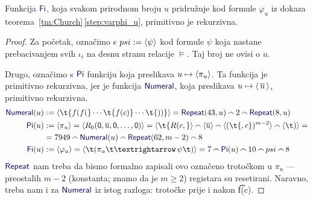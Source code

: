 \begin{lema}[{name=[primitivna rekurzivnost svođenja $K$ na $Valid$]}]
Funkcija $\f{Fi}$, koja svakom prirodnom broju $u$ pridružuje kod formule $\varphi_u$ iz dokaza teorema~\ref{tm:Church}\,\eqref{step:varphi_u}, primitivno je rekurzivna.
\end{lema}
\begin{proof}
Za početak, označimo s $psi:=\langle\psi\rangle$ kod formule $\psi$ koja nastane prebacivanjem svih $\iota_i$ na desnu stranu relacije $\models$. Taj broj ne ovisi o $u$.

Drugo, označimo s $\f{Pi}$ funkciju koja preslikava $u\mapsto\langle\pi_u\rangle$. Ta funkcija je primitivno rekurzivna, jer je funkcija $\f{Numeral}$, koja preslikava $u\mapsto\langle\,\overline u\,\rangle$, primitivno rekurzivna.
\begin{align}
    \f{Numeral}(u)&:=\kr{\t{f(f(}\dotsm\t{f(c)}\dotsm\t{))}}=\f{Repeat}(43,u)\conc{}2\conc{}\f{Repeat}(8,u)\\
    \f{Pi}(u)&:=\kr{\pi_u}=\kr{R_0(\mathsf0,\overline u,\mathsf0,\dotsc,\mathsf0)}=
    \kr{\t{R(c,}}\conc{}\kr{\overline u}\conc{}\kr{(\t{,c})^{m-2}}\conc{}\kr{\t)}=\notag\\
    &=7949\conc{}\f{Numeral}(u)\conc{}\f{Repeat}(62,m-2)\conc{}8\\
    \f{Fi}(u)&:=\kr{\varphi_u}=\kr{\t(\pi_u\!\,\t\textrightarrow\,\psi\t)}=7\conc{}\f{Pi}(u)\conc{}10\conc{}psi\conc{}8
\end{align}
    $\f{Repeat}$ nam treba da bismo formalno zapisali ovo označeno trotočkom u $\pi_u$ --- preostalih $m-2$ (konstanta; znamo da je $m\ge2$) registara su resetirani. Naravno, treba nam i za $\f{Numeral}$ iz istog razloga: trotočke prije i nakon \t{f(c)}.
\end{proof}


